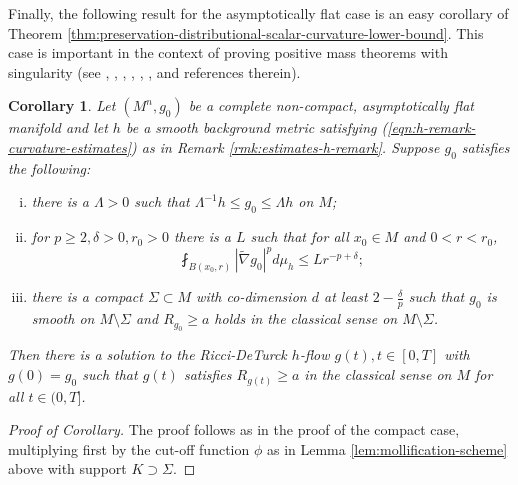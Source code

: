 \documentclass[12pt]{amsart}
\theoremstyle{plain}
\theoremstyle{plain}
\newtheorem{corollary}[subsection]{Corollary}
\theoremstyle{definition}
\theoremstyle{remark}
\numberwithin{equation}{subsection}
\newcommand{\hdel}{\tilde{\nabla}}
\begin{document}
Finally, the following result for the asymptotically flat case is an easy corollary of Theorem \ref{thm:preservation-distributional-scalar-curvature-lower-bound}. This case is important in the context of proving positive mass theorems with singularity (see \cite{miao_positive_2003}, \cite{lee_positive_2013}, \cite{lee_positive_2015}, \cite{shi_scalar_2016}, \cite{jiang_removable_2022}, \cite{lee_continuous_2021}, \cite{chu_ricci-deturck_2022} and references therein).

\begin{corollary}\label{thm:non-cpt-dist-scalar-curvature-lower-bdd}
    Let $(M^n, g_0)$ be a complete non-compact, asymptotically flat manifold and let $h$ be a smooth background metric satisfying (\ref{eqn:h-remark-curvature-estimates}) as in Remark \ref{rmk:estimates-h-remark}. Suppose $g_0$ satisfies the following:
    \begin{enumerate}[(i)]
        \item there is a $\Lambda > 0$ such that $\Lambda^{-1}h \leq g_0 \leq \Lambda h$ on $M$;
        \item for $p \geq 2, \delta > 0, r_0 > 0$ there is a $L$ such that for all $x_0 \in M$ and $0 < r < r_0$,
        \begin{equation}
            \fint_{B(x_0, r)} |\hdel g_0|^p d\mu_h \leq L r^{-p + \delta};
        \end{equation}
        \item there is a compact $\Sigma \subset M$ with co-dimension $d$ at least $2 - \frac{\delta}{p}$ such that $g_0$ is smooth on $M \setminus \Sigma$ and $R_{g_0} \geq a$ holds in the classical sense on $M \setminus \Sigma$.
    \end{enumerate}
    Then there is a solution to the Ricci-DeTurck $h$-flow $g(t), t\in [0,T]$ with $g(0) = g_0$ such that $g(t)$ satisfies $R_{g(t)} \geq a$ in the classical sense on $M$ for all $t \in (0, T]$.
\end{corollary}

\begin{proof}[Proof of Corollary]
    The proof follows as in the proof of the compact case, multiplying first by the cut-off function $\phi$ as in Lemma \ref{lem:mollification-scheme} above with support $K \supset \Sigma$.
\end{proof}

\newpage

\printbibliography[title=References]
\end{document}
